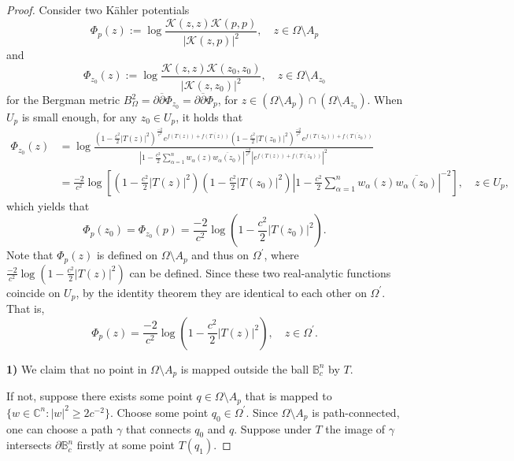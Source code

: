 \documentclass[12pt] {article}
\numberwithin{equation}{section}
\begin{document}
\begin{proof}
   Consider two K\"{a}hler potentials
 $$
\Phi_{p}(z):= \log \frac{\mathcal{K}(z, z)  \mathcal{K}(p, p)}{ |\mathcal{K}(z, p)|^2}, \quad  z \in \Omega \setminus A_{p}
$$
and 
$$
\Phi_{z_0}(z):= \log \frac{\mathcal{K}(z, z)  \mathcal{K}({z_0}, {z_0})}{ |\mathcal{K}(z, {z_0})|^2}, \quad  z \in \Omega \setminus A_{z_0}
$$
for the Bergman metric $B^2_\Omega=\partial \overline  \partial   \Phi_{z_0}=\partial \overline  \partial   \Phi_{p}$, for $z \in (\Omega \setminus A_{p}) \cap (\Omega \setminus A_{z_0})$. 
When $U_p$ is small enough,  for any $z_0\in U_p$, it holds that
 \begin{align*}
\Phi_{z_0}( z)&= \log \frac{\left (1 - \frac{c^2}{2} |T(z)|^2 \right )^{\frac{-2}{c^2}} e^{f(T(z))+\overline{f(T(z))}}   \left (1 - \frac{c^2}{2} |T(z_0)|^2 \right )^{\frac{-2}{c^2}} e^{f(T(z_0))+\overline{f(T(z_0))}}  }{  \left |1 - \frac{c^2}{2}   \sum_{\alpha=1}^n  w_\alpha(z)     \overline {w_\alpha(z_0)}   \right |^{\frac{-4}{c^2}} |e^{f(T(z))+\overline{f(T({z_0}))}}  |^2}\\
& =  {\frac{-2}{c^2}}   \log  \left[    \left (1 - \frac{c^2}{2} |T(z)|^2 \right )  \left (1 - \frac{c^2}{2} |T(z_0)|^2 \right )  \left  | 1 - \frac{c^2}{2}   \sum_{\alpha=1}^n  w_\alpha(z)     \overline {w_\alpha(z_0)}   \right  |^{ -2}  \right  ], \quad z\in U_p,
 \end{align*}
which yields that
$$
\Phi_{p}(z_0)= \Phi_{z_0}(p) = {\frac{-2}{c^2}} \log  \left (1 - \frac{c^2}{2} |T(z_0)|^2 \right ).
$$
Note that $\Phi_{p}(z)$ is defined on $\Omega \setminus A_p$ and thus on $\Omega^{\prime}$, where ${\frac{-2}{c^2}} \log  \left (1 - \frac{c^2}{2} |T(z )|^2 \right )$ can be defined. Since these two real-analytic  functions coincide on  $U_p$, by the identity theorem they are identical to each other on $\Omega^{\prime}$. That is, 
\begin{equation} \label{on Omega prime}
\Phi_{p}(z )=  {\frac{-2}{c^2}} \log  \left (1 - \frac{c^2}{2} |T(z )|^2 \right ), \quad z \in \Omega^{\prime}.
\end{equation} 

 \medskip
 
{\bf 1)} We claim that  no point in  $\Omega \setminus A_p$ is mapped outside the ball $\mathbb B_c^n$ by $T$. 

If not, suppose there exists some point $q \in  \Omega \setminus A_p$ that is mapped to $\{ w \in \mathbb C^n:   |w|^2 \geq {2}{c^{-2}} \}$. Choose some point $q_0 \in \Omega^{\prime}$.  Since $\Omega \setminus A_p$ is path-connected, one can choose a path $\gamma$ that connects $q_0$ and $q$. Suppose under $T$ the image of $\gamma$   intersects $\partial   \mathbb B_c^n$ firstly at some point $T(q_1)$.


\end{proof}
\end{document}
